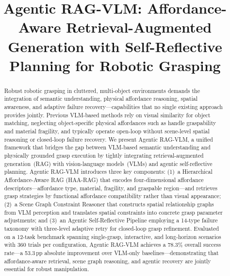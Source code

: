 \documentclass[letterpaper, 10pt, conference]{ieeeconf}
\newcommand{\sysname}{Agentic RAG-VLM}
\newcommand{\haarag}{HAA-RAG}
\begin{document}
\title{\LARGE \bf Agentic RAG-VLM: Affordance-Aware Retrieval-Augmented\\Generation with Self-Reflective Planning for Robotic Grasping}

\author{}

\maketitle
\thispagestyle{empty}
\pagestyle{empty}

\begin{abstract}
Robust robotic grasping in cluttered, multi-object environments demands the integration of semantic understanding, physical affordance reasoning, spatial awareness, and adaptive failure recovery---capabilities that no single existing approach provides jointly.
Previous VLM-based methods rely on visual similarity for object matching, neglecting object-specific physical affordances such as handle graspability and material fragility, and typically operate open-loop without scene-level spatial reasoning or closed-loop failure recovery.
We present \sysname{}, a unified framework that bridges the gap between VLM-based semantic understanding and physically grounded grasp execution by tightly integrating retrieval-augmented generation~(RAG) with vision-language models~(VLMs) and agentic self-reflective planning.
\sysname{} introduces three key components:
(1)~a Hierarchical Affordance-Aware RAG (\haarag{}) that encodes four-dimensional affordance descriptors---affordance type, material, fragility, and graspable region---and retrieves grasp strategies by functional affordance compatibility rather than visual appearance;
(2)~a Scene Graph Constraint Reasoner that constructs spatial relationship graphs from VLM perception and translates spatial constraints into concrete grasp parameter adjustments;
and (3)~an Agentic Self-Reflective Pipeline employing a 14-type failure taxonomy with three-level adaptive retry for closed-loop grasp refinement.
Evaluated on a 12-task benchmark spanning single-grasp, interactive, and long-horizon scenarios with 360 trials per configuration, \sysname{} achieves a 78.3\% overall success rate---a 53.3\,pp absolute improvement over VLM-only baselines---demonstrating that affordance-aware retrieval, scene graph reasoning, and agentic recovery are jointly essential for robust manipulation.
\end{abstract}
\end{document}
